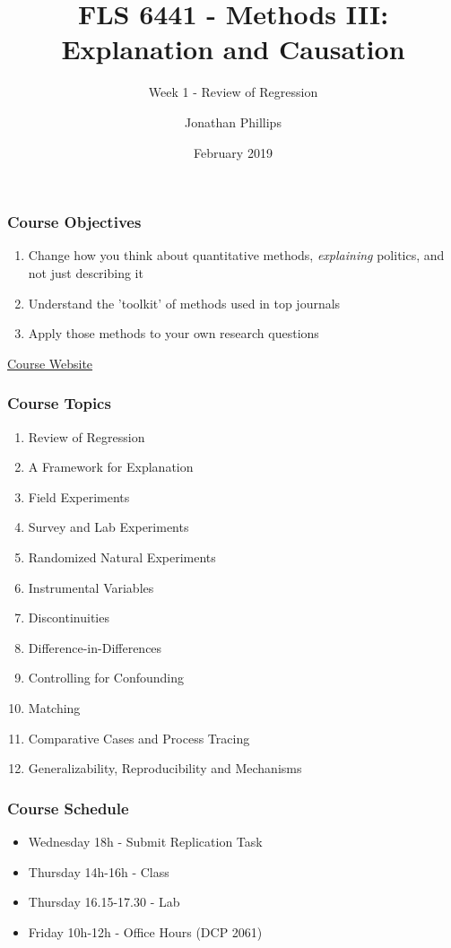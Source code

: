 \documentclass[xcolor=x11names,compress]{beamer}\usepackage[]{graphicx}\usepackage[]{color}
\title{FLS 6441 - Methods III: Explanation and Causation}
\subtitle{Week 1 - Review of Regression}
\author{Jonathan Phillips}
\date{February 2019}
\renewcommand{\(}{\begin{columns}}
\renewcommand{\)}{\end{columns}}
\newcommand{\<}[1]{\begin{column}{#1}}
\renewcommand{\>}{\end{column}}
\begin{document}
\frame{\titlepage}

\begin{frame}
\frametitle{Course Objectives}
\begin{enumerate}
\item Change how you think about quantitative methods, \textit{explaining} politics, and not just describing it
\item Understand the 'toolkit' of methods used in top journals
\item Apply those methods to your own research questions
\end{enumerate}
\begin{center}
\href{https://jonnyphillips.github.io/Methods_III}{Course Website}
\end{center}
\end{frame}

\begin{frame}
\frametitle{Course Topics}
\begin{enumerate}
\item Review of Regression
\item A Framework for Explanation
\item Field Experiments
\item Survey and Lab Experiments
\item Randomized Natural Experiments
\item Instrumental Variables
\item Discontinuities
\item Difference-in-Differences
\item Controlling for Confounding
\item Matching
\item Comparative Cases and Process Tracing
\item Generalizability, Reproducibility and Mechanisms
\end{enumerate}
\end{frame}

\begin{frame}
\frametitle{Course Schedule}
\begin{itemize}
\item Wednesday 18h - Submit Replication Task
\item Thursday 14h-16h - Class
\item Thursday 16.15-17.30 - Lab
\item Friday 10h-12h - Office Hours (DCP 2061)
\end{itemize}
\end{frame}
\end{document}
